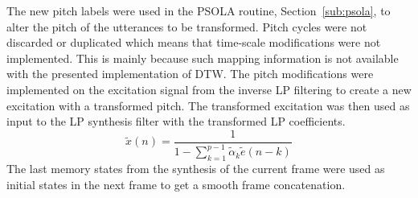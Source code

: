 The new pitch labels were used in the PSOLA routine, Section~\ref{sub:psola}, to alter the pitch of the utterances to be transformed. Pitch cycles were not discarded or duplicated which means that time-scale modifications were not implemented. This is mainly because such mapping information is not available with the presented implementation of DTW. The pitch modifications were implemented on the excitation signal from the inverse LP filtering to create a new excitation with a transformed pitch. The transformed excitation was then used as input to the LP synthesis filter with the transformed LP coefficients. 
\begin{equation}
	\tilde{x}(n) = \frac{1}{1 - \sum_{k=1}^{p-1} \tilde{\alpha}_k \tilde{e}(n-k)}
\end{equation}
The last memory states from the synthesis of the current frame were used as initial states in the next frame to get a smooth frame concatenation.



